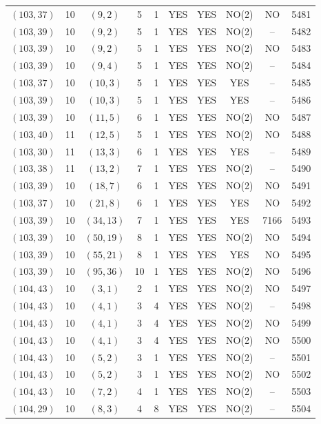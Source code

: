 \begin{longtable}{|c|c|c|c|c|c|c|c|c|c|}
$(103, 37)$ & 10 & $(9, 2)$ & 5 & 1 & YES & YES & NO(2) & NO & 5481\\
$(103, 39)$ & 10 & $(9, 2)$ & 5 & 1 & YES & YES & NO(2) & -- & 5482\\
$(103, 39)$ & 10 & $(9, 2)$ & 5 & 1 & YES & YES & NO(2) & NO & 5483\\
$(103, 39)$ & 10 & $(9, 4)$ & 5 & 1 & YES & YES & NO(2) & -- & 5484\\
$(103, 37)$ & 10 & $(10, 3)$ & 5 & 1 & YES & YES & YES & -- & 5485\\
$(103, 39)$ & 10 & $(10, 3)$ & 5 & 1 & YES & YES & YES & -- & 5486\\
$(103, 39)$ & 10 & $(11, 5)$ & 6 & 1 & YES & YES & NO(2) & NO & 5487\\
$(103, 40)$ & 11 & $(12, 5)$ & 5 & 1 & YES & YES & NO(2) & NO & 5488\\
$(103, 30)$ & 11 & $(13, 3)$ & 6 & 1 & YES & YES & YES & -- & 5489\\
$(103, 38)$ & 11 & $(13, 2)$ & 7 & 1 & YES & YES & NO(2) & -- & 5490\\
$(103, 39)$ & 10 & $(18, 7)$ & 6 & 1 & YES & YES & NO(2) & NO & 5491\\
$(103, 37)$ & 10 & $(21, 8)$ & 6 & 1 & YES & YES & YES & NO & 5492\\
$(103, 39)$ & 10 & $(34, 13)$ & 7 & 1 & YES & YES & YES & 7166 & 5493\\
$(103, 39)$ & 10 & $(50, 19)$ & 8 & 1 & YES & YES & NO(2) & NO & 5494\\
$(103, 39)$ & 10 & $(55, 21)$ & 8 & 1 & YES & YES & YES & NO & 5495\\
$(103, 39)$ & 10 & $(95, 36)$ & 10 & 1 & YES & YES & NO(2) & NO & 5496\\
$(104, 43)$ & 10 & $(3, 1)$ & 2 & 1 & YES & YES & NO(2) & NO & 5497\\
$(104, 43)$ & 10 & $(4, 1)$ & 3 & 4 & YES & YES & NO(2) & -- & 5498\\
$(104, 43)$ & 10 & $(4, 1)$ & 3 & 4 & YES & YES & NO(2) & NO & 5499\\
$(104, 43)$ & 10 & $(4, 1)$ & 3 & 4 & YES & YES & NO(2) & NO & 5500\\
$(104, 43)$ & 10 & $(5, 2)$ & 3 & 1 & YES & YES & NO(2) & -- & 5501\\
$(104, 43)$ & 10 & $(5, 2)$ & 3 & 1 & YES & YES & NO(2) & NO & 5502\\
$(104, 43)$ & 10 & $(7, 2)$ & 4 & 1 & YES & YES & NO(2) & -- & 5503\\
$(104, 29)$ & 10 & $(8, 3)$ & 4 & 8 & YES & YES & NO(2) & -- & 5504\\

\end{longtable}
